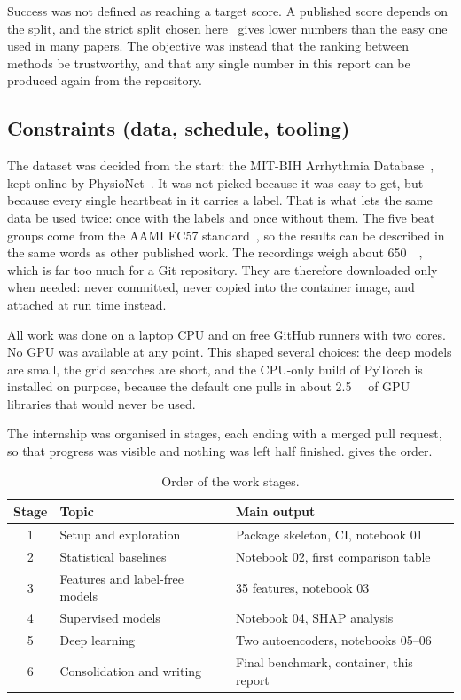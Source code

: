 \documentclass[a4paper, 12pt]{article}
\begin{document}
Success was not defined as reaching a target score. A published score depends on
the split, and the strict split chosen here~\cite{dechazal2004} gives lower numbers
than the easy one used in many papers. The objective was instead that the ranking
between methods be trustworthy, and that any single number in this report can be
produced again from the repository.


\subsection{Constraints (data, schedule, tooling)} \label{subsec:constraints}

The dataset was decided from the start: the MIT-BIH Arrhythmia
Database~\cite{moody2001mitbih}, kept online by PhysioNet~\cite{goldberger2000physionet}.
It was not picked because it was easy to get, but because every single
heartbeat in it carries a label. That is what lets the same data be used
twice: once with the labels and once without them. The five beat groups
come from the AAMI EC57 standard~\cite{aami2012ec57}, so the results can be
described in the same words as other published work. The recordings weigh
about \SI{650}{\mega\byte}, which is far too much for a Git repository.
They are therefore downloaded only when needed: never committed, never
copied into the container image, and attached at run time instead.

All work was done on a laptop CPU and on free GitHub runners with two cores. 
No GPU was available at any point. This shaped several choices: the deep models 
are small, the grid searches are short, and the CPU-only build of PyTorch is 
installed on purpose, because the default one pulls in about \SI{2.5}{\giga\byte} 
of GPU libraries that would never be used.

The internship was organised in stages, each ending with a merged pull request, 
so that progress was visible and nothing was left half finished. 
 gives the order.

\begin{table}[htbp]
  \centering
  \small
  \caption{Order of the work stages.}
  \label{tab:schedule}
  \begin{tabular}{@{}clp{}@{}}
    \toprule
    \textbf{Stage} & \textbf{Topic} & \textbf{Main output} \\
    \midrule
    1 & Setup and exploration & Package skeleton, CI, notebook 01 \\
    2 & Statistical baselines & Notebook 02, first comparison table \\
    3 & Features and label-free models & 35 features, notebook 03 \\
    4 & Supervised models & Notebook 04, SHAP analysis \\
    5 & Deep learning & Two autoencoders, notebooks 05--06 \\
    6 & Consolidation and writing & Final benchmark, container, this report \\
    \bottomrule
  \end{tabular}
\end{table}
\end{document}
